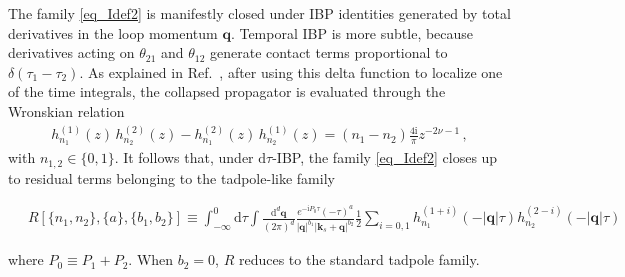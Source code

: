 \documentclass[%
 reprint,
 amsmath,amssymb,
 aps,
prd,
]{revtex4-2}
\def\di{{\mathrm{d}}}
\def\mb{\mathbf}
\def\ii{\mathrm{i}}
\begin{document}
The family \eqref{eq_Idef2} is manifestly closed under IBP identities generated by total derivatives in the loop momentum \(\mb q\). Temporal IBP is more subtle, because derivatives acting on \(\theta_{21}\) and \(\theta_{12}\) generate contact terms proportional to \(\delta(\tau_1-\tau_2)\). As explained in Ref.~\cite{Chen:2023iix}, after using this delta function to localize one of the time integrals, the collapsed propagator is evaluated through the Wronskian relation
\begin{align}
h_{n_1}^{(1)}(z)\,h_{n_2}^{(2)}(z)-h_{n_1}^{(2)}(z)\,h_{n_2}^{(1)}(z)
= (n_1-n_2)\frac{4\ii}{\pi}z^{-2\nu-1}\,,
\label{eq_propcontract}
\end{align}
with \(n_{1,2}\in\{0,1\}\). It follows that, under \(\di\tau\)-IBP, the family \eqref{eq_Idef2} closes up to residual terms belonging to the tadpole-like family 
\begin{widetext}
\begin{align}\label{eq_Rdef}
&~R[\{n_1,n_2\},\{a\},\{b_1,b_2\}]
\equiv\int_{-\infty}^0 \di\tau \int \frac{\di^d \mb q}{(2\pi)^d}  \frac{e^{-\ii P_0\tau} (-\tau)^{a}}{|\mb q|^{b_1}|\mb k_s+\mb q|^{b_2}}  \frac{1}{2}\sum_{i=0,1} h_{n_1}^{(1+i)}(-|\mb q|\tau)h_{n_2}^{(2-i)}(-|\mb q|\tau) %
\end{align}
\end{widetext}
where \(P_0\equiv P_1+P_2\). When \(b_2=0\), \(R\) reduces to the standard tadpole family.
\end{document}

